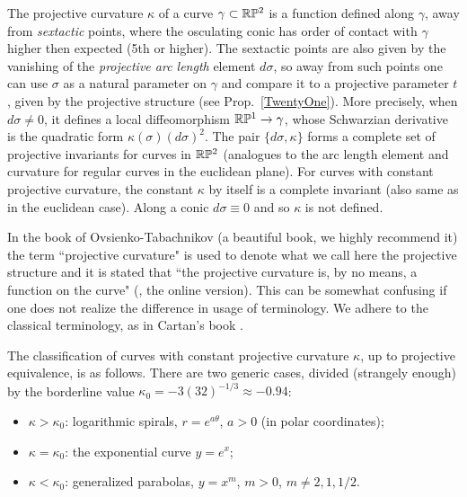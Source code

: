  The projective curvature $\kappa$ of a curve $\gamma\subset \mathbb{R}\mathbb{P}^2$ is a function defined along $\gamma$, away from {\em sextactic}  points,  where the osculating conic has order of contact with $\gamma$  higher then expected (5th or higher).  
The  sextactic points are also given by the vanishing of the {\em projective arc length}  element $d\sigma$, so away from such points one can use $\sigma$ as a natural parameter on $\gamma$ and compare it to a projective parameter $t$, given by the projective structure (see Prop.~\ref{TwentyOne}).  More precisely, when $d\sigma\neq 0$, it defines a local diffeomorphism $\mathbb{R}\mathbb{P}^1\to \gamma$, whose  Schwarzian derivative is  the  quadratic form $\kappa(\sigma)(d\sigma)^2$. The pair $\{ d\sigma, \kappa\}$  forms a complete set of projective invariants for curves in $\mathbb{R}\mathbb{P}^2$ (analogues to the arc length element and curvature for regular curves in the euclidean plane). For  curves with constant projective curvature, the constant $\kappa$ by  itself is a complete invariant (also same as in the euclidean case). Along a conic $d\sigma\equiv 0$ and so $\kappa$ is not defined.

 
 \begin{rmrk}  In the book of Ovsienko-Tabachnikov \cite{OT} (a beautiful book, we highly recommend it) the  term ``projective curvature" is used to denote what we call here the projective structure and it is stated  that ``the projective curvature is, by no means, a function on the curve" (\cite[p.~14]{OT},  the online version). This can be somewhat   confusing if one does not realize the difference in usage of terminology. We adhere to the classical terminology, as in  Cartan's book \cite{Cbook}. 
 \end{rmrk}

The classification of curves with constant projective curvature $\kappa$, up to projective equivalence,  is as follows. There are two generic cases, divided (strangely enough) by the borderline value $\kappa_0=-3(32)^{-1/3}\approx-0.94$: 
\begin{itemize}
\item $\kappa>\kappa_0$: logarithmic spirals, $r=e^{a\theta}$, $a>0$ (in polar coordinates); 
\item $\kappa=\kappa_0$: the exponential curve $y=e^x$;
\item $\kappa<\kappa_0$: generalized parabolas, $y=x^m$, $m>0$, $m\neq 2, 1, 1/2.$ 
\end{itemize}
 
 
 
